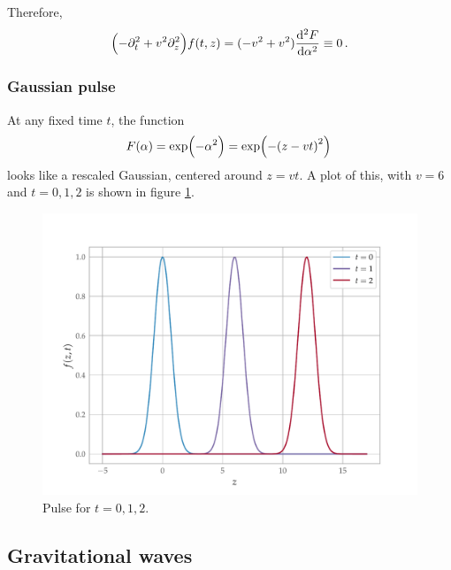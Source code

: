\documentclass[main.tex]{subfiles}
\begin{document}
Therefore, 
%
\begin{align}
\qty(-\partial_{t}^2 + v^2 \partial_{z}^2) f(t, z) 
= (-v^2 + v^2) \dv[2]{F}{\alpha } \equiv 0 
\,.
\end{align}

\subsubsection{Gaussian pulse}

At any fixed time \(t\), the function 
%
\begin{align}
F(\alpha ) = \exp(- \alpha^2) = \exp(- \qty(z - v t)^2)
\,
\end{align}
%
looks like a rescaled Gaussian, centered around \(z = vt\). A plot of this, with \(v = 6\) and \(t = 0, 1, 2\) is shown in figure \ref{fig:moving-gaussian-pulse}.

\begin{figure}[H]
\centering
\includegraphics[width=\textwidth]{figures/gauss.pdf}
\caption{Pulse for \(t = 0, 1, 2\).}
\label{fig:moving-gaussian-pulse}
\end{figure}

\subsection{Gravitational waves}
\end{document}
